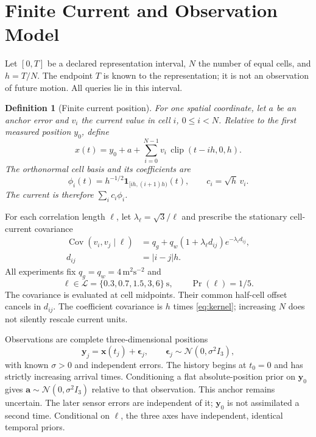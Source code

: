 \documentclass[journal]{IEEEtran}
\newtheorem{definition}{Definition}
\newcommand{\Cov}{\operatorname{Cov}}
\newcommand{\Normal}{\mathcal{N}}
\newcommand{\clip}{\operatorname{clip}}
\begin{document}
\section{Finite Current and Observation Model}
\label{sec:model}

Let $[0,T]$ be a declared representation interval, $N$ the number of equal
cells, and $h=T/N$. The endpoint $T$ is known to the representation; it is
not an observation of future motion. All queries lie in this interval.

\begin{definition}[Finite current position]
For one spatial coordinate, let $a$ be an anchor error and $v_i$ the
current value in cell $i$, $0\leq i<N$. Relative to the first measured
position $y_0$, define
\begin{equation}
 x(t)=y_0+a+\sum_{i=0}^{N-1}v_i\,\clip(t-ih,0,h).
 \label{eq:position}
\end{equation}
The orthonormal cell basis and its coefficients are
\begin{equation*}
 \phi_i(t)=h^{-1/2}\bm{1}_{[ih,(i+1)h)}(t),\qquad c_i=\sqrt h\,v_i.
\end{equation*}
The current is therefore $\sum_i c_i\phi_i$.
\end{definition}

For each correlation length $\ell$, let $\lambda_\ell=\sqrt{3}/\ell$ and
prescribe the stationary cell-current covariance
\begin{align}
 \Cov(v_i,v_j\mid\ell)
 &=q_g+q_w(1+\lambda_\ell d_{ij})e^{-\lambda_\ell d_{ij}},
 \label{eq:kernel}\\
 d_{ij}&=|i-j|h.\nonumber
\end{align}
All experiments fix $q_g=q_w=4\,\mathrm{m}^2\mathrm{s}^{-2}$ and
\begin{equation}
 \ell\in\mathcal L=\{0.3,0.7,1.5,3,6\}\ \mathrm{s},
 \qquad \Pr(\ell)=1/5.
 \label{eq:lengths}
\end{equation}
The covariance is evaluated at cell midpoints. Their common half-cell
offset cancels in $d_{ij}$. The coefficient covariance is $h$ times
\eqref{eq:kernel}; increasing $N$ does not silently rescale current units.

Observations are complete three-dimensional positions
\begin{equation}
 \bm y_j=\bm x(t_j)+\bm\epsilon_j,
 \qquad \bm\epsilon_j\sim\Normal(0,\sigma^2I_3),
 \label{eq:observations}
\end{equation}
with known $\sigma>0$ and independent errors. The history begins at
$t_0=0$ and has strictly increasing arrival times. Conditioning a flat
absolute-position prior on $\bm y_0$ gives
$\bm a\sim\Normal(0,\sigma^2I_3)$ relative to that observation. This
anchor remains uncertain. The later sensor errors are independent of it;
$\bm y_0$ is not assimilated a second time. Conditional on $\ell$, the
three axes have independent, identical temporal priors.
\end{document}
